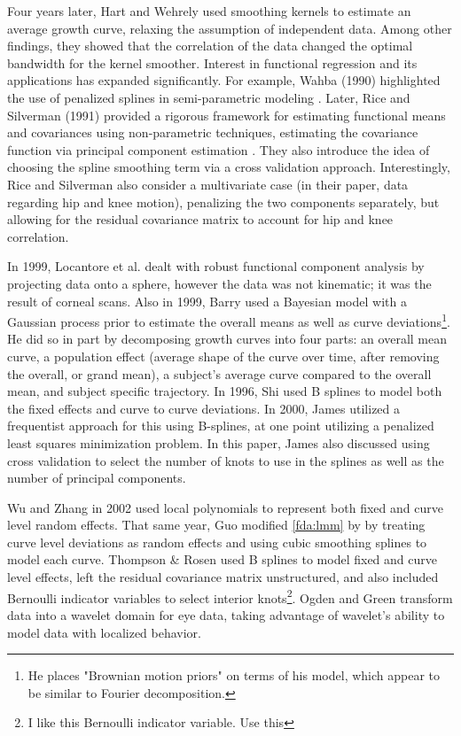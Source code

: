 Four years later, Hart and Wehrely used smoothing kernels to estimate an average growth curve, relaxing the assumption of independent data\cite{hart_kernel_1986}.  
Among other findings, they showed that the correlation of the data changed the optimal bandwidth for the kernel smoother.  
Interest in functional regression and its applications has expanded significantly.  
For example, Wahba (1990) highlighted the use of penalized splines in semi-parametric modeling \cite{wahba_spline_1990}.  
Later, Rice and Silverman (1991) provided a rigorous framework for estimating functional means and covariances using non-parametric techniques, estimating the covariance function via principal component estimation \cite{rice_estimating_1991}.  
They also introduce the idea of choosing the spline smoothing term via a cross validation approach.  
Interestingly, Rice and Silverman also consider a multivariate case (in their paper, data regarding hip and knee motion), 
penalizing the two components separately, but allowing for the residual covariance matrix to account for hip and knee correlation.

In 1999, Locantore et al. dealt with robust functional component analysis by projecting data onto a sphere, however the data was not kinematic; it was the result of corneal scans\cite{locantore_robust_1999}.  
Also in 1999, Barry used a Bayesian model with a Gaussian process prior to estimate the overall means as well as curve deviations\footnote{He places "Brownian motion priors" on terms of his model, which appear to be similar to Fourier decomposition.}\cite{barry_bayesian_1995}.  
He did so in part by decomposing growth curves into four parts: an overall mean curve, a population effect (average shape of the curve over time, after removing the overall, or grand mean), a subject's average curve compared to the overall mean, and subject specific trajectory.  
In 1996, Shi used B splines to model both the fixed effects and curve to curve deviations\cite{shi_analysis_1996}.  
In 2000, James utilized a frequentist approach for this using B-splines, at one point utilizing a penalized least squares minimization problem\cite{james_principal_2000}.  
In this paper, James also discussed using cross validation to select the number of knots to use in the splines as well as the number of principal components. 

Wu and Zhang in 2002 used local polynomials to represent both fixed and curve level random effects\cite{wu_local_2002}.  
That same year, Guo modified \eqref{fda:lmm} by by treating curve level deviations as random effects and using cubic smoothing splines to model each curve\cite{guo_functional_2002}.  
Thompson \& Rosen used B splines to model fixed and curve level effects, left the residual covariance matrix unstructured, and also included Bernoulli indicator variables to select interior knots\cite{thompson_bayesian_2008}\footnote{I like this Bernoulli indicator variable.  Use this}.  
Ogden and Green transform data into a wavelet domain for eye data, taking advantage of wavelet's ability to model data with localized behavior\cite{ogden_wavelet_2010}.  

